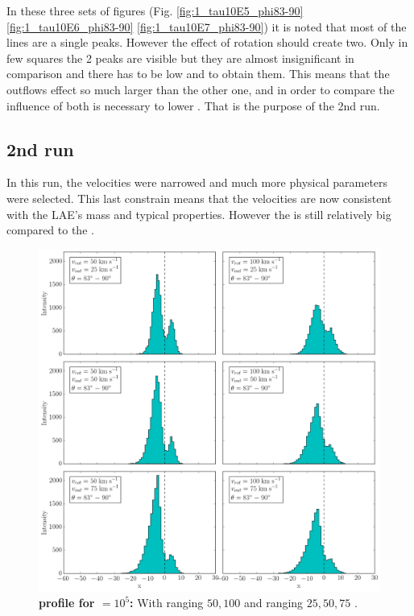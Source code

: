 In these three sets of figures (Fig. \ref{fig:1_tau10E5_phi83-90} \ref{fig:1_tau10E6_phi83-90} \ref{fig:1_tau10E7_phi83-90}) it is noted that most of the lines are a single peaks. However the effect of rotation should create two. Only in few squares the 2 peaks are visible but they are almost insignificant in comparison and there has to be low \vrot and \vout to obtain them. This means that the outflows effect so much larger than the other one, and in order to compare the influence of both is necessary to lower \vout. That is the purpose of the 2nd run.\\

\newpage

\subsection{2nd run}

In this run, the velocities were narrowed and much more physical parameters were selected. This last constrain means that the velocities are now consistent with the LAE's mass and typical properties. However the \vout is still relatively big compared to the \vrot. \\

\begin{figure}[h!]
	\begin{center}
		\includegraphics[width=1\textwidth]{./figures/chapter3/2_tau10E5_phi83-90}
	\end{center}
	\caption{\textbf{\lya profile for \tauh$=10^5$:} With \vrot ranging $50,100$ \kms and \vout ranging $25,50,75$ \kms.
		\label{fig:2_tau10E5_phi83-90}}
\end{figure}


